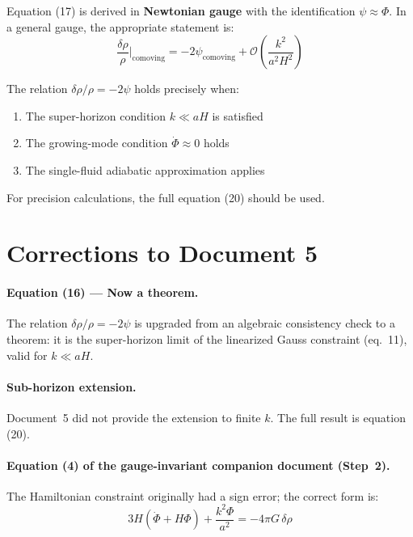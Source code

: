 \documentclass[12pt,a4paper]{article}
\begin{document}
Equation (17) is derived in \textbf{Newtonian gauge} with the identification $\psi \approx \Phi$. In a general gauge, the appropriate statement is:
\begin{equation}
\frac{\delta\rho}{\rho}\bigg|_\text{comoving} = -2\psi_\text{comoving} + \mathcal{O}\!\left(\frac{k^2}{a^2H^2}\right) \tag{29}
\end{equation}

The relation $\delta\rho/\rho = -2\psi$ holds precisely when:

\begin{enumerate}
  \item The super-horizon condition $k \ll aH$ is satisfied
  \item The growing-mode condition $\dot\Phi \approx 0$ holds
  \item The single-fluid adiabatic approximation applies
\end{enumerate}

For precision calculations, the full equation (20) should be used.

\section{Corrections to Document 5}

\paragraph{Equation (16) --- Now a theorem.} The relation $\delta\rho/\rho = -2\psi$ is upgraded from an algebraic consistency check to a theorem: it is the super-horizon limit of the linearized Gauss constraint (eq.~11), valid for $k \ll aH$.

\paragraph{Sub-horizon extension.} Document~5 did not provide the extension to finite $k$. The full result is equation (20).

\paragraph{Equation (4) of the gauge-invariant companion document (Step~2).} The Hamiltonian constraint originally had a sign error; the correct form is:
\begin{equation}
3H(\dot\Phi + H\Phi) + \frac{k^2\Phi}{a^2} = -4\pi G\,\delta\rho \tag{30}
\end{equation}
\end{document}
